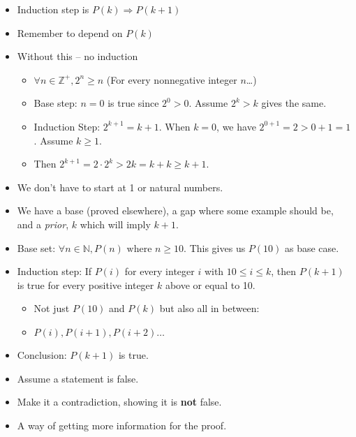 \documentclass[english,10pt,a4paper]{article}
\begin{document}
\begin{theo} 
\begin{itemize}
\item Induction step is $P(k) \Rightarrow P(k+1)$
\item Remember to depend on $P(k)$
\item Without this -- no induction
\begin{itemize}
\item $\forall n \in \mathbb{Z}^+, 2^n \geq n$ (For every nonnegative integer $n$\dots)
\item Base step: $n=0$ is true since $2^0>0$. Assume $2^k>k$ gives the same.
\item Induction Step: $2^{k+1}=k+1$. When $k=0$, we have $2^{0+1}=2 > 0+1=1$. Assume $k\geq 1$. 
\item Then $2^{k+1}=2\cdot 2^k > 2k=k+k \geq k+1$.
\end{itemize}
\end{itemize}
\end{theo}



\begin{theo} 
\begin{itemize}
\item We don't have to start at 1 or natural numbers.
\item We have a base (proved elsewhere), a gap where some example should be, and a \textit{prior}, $k$ which will imply $k+1$.
\item Base set: $\forall n \in \mathbb{N}, P(n) \text{ where } n \geq 10$. This gives us $P(10)$ as base case.
\item Induction step: If $P(i)$ for every integer $i$ with $10 \leq i \leq k$, then $P(k+1)$ is true for every positive integer $k$ above or equal to 10.
	\begin{itemize}
	\item Not just $P(10)$ and $P(k)$ but also all in between:
	\item[] $P(i), P(i+1), P(i+2) \ldots$
	\end{itemize}
\item Conclusion: $P(k+1)$ is true.
\end{itemize}
\end{theo}


\begin{theo} 
\begin{itemize}
\item Assume a statement is false.
\item Make it a contradiction, showing it is \textbf{not} false.
\item A way of getting more information for the proof.
\end{itemize}
\end{theo}
\end{document}
